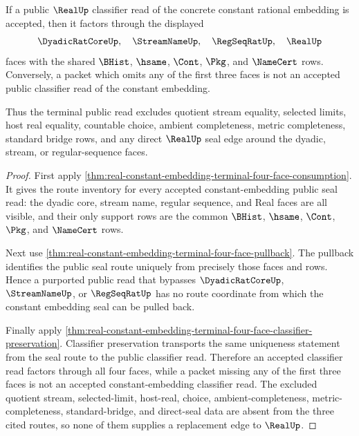\begin{theorem}
\label{thm:real-terminal-four-face-no-direct-seal-collapse}
If a public $\RealUp$ classifier read of the concrete constant rational
embedding is accepted, then it factors through the displayed
$$
\DyadicRatCoreUp,\quad \StreamNameUp,\quad \RegSeqRatUp,\quad \RealUp
$$
faces with the shared $\BHist$, $\hsame$, $\Cont$, $\Pkg$, and $\NameCert$
rows. Conversely, a packet which omits any of the first three faces is not an
accepted public classifier read of the constant embedding.

Thus the terminal public read excludes quotient stream equality, selected
limits, host real equality, countable choice, ambient completeness, metric
completeness, standard bridge rows, and any direct $\RealUp$ seal edge around
the dyadic, stream, or regular-sequence faces.
\end{theorem}
\begin{proof}
First apply
\autoref{thm:real-constant-embedding-terminal-four-face-consumption}. It gives
the route inventory for every accepted constant-embedding public seal read:
the dyadic core, stream name, regular sequence, and Real faces are all visible,
and their only support rows are the common $\BHist$, $\hsame$, $\Cont$, $\Pkg$,
and $\NameCert$ rows.

Next use
\autoref{thm:real-constant-embedding-terminal-four-face-pullback}. The pullback
identifies the public seal route uniquely from precisely those faces and rows.
Hence a purported public read that bypasses $\DyadicRatCoreUp$,
$\StreamNameUp$, or $\RegSeqRatUp$ has no route coordinate from which the
constant embedding seal can be pulled back.

Finally apply
\autoref{thm:real-constant-embedding-terminal-four-face-classifier-preservation}.
Classifier preservation transports the same uniqueness statement from the seal
route to the public classifier read. Therefore an accepted classifier read
factors through all four faces, while a packet missing any of the first three
faces is not an accepted constant-embedding classifier read. The excluded
quotient stream, selected-limit, host-real, choice, ambient-completeness,
metric-completeness, standard-bridge, and direct-seal data are absent from the
three cited routes, so none of them supplies a replacement edge to $\RealUp$.
\end{proof}

